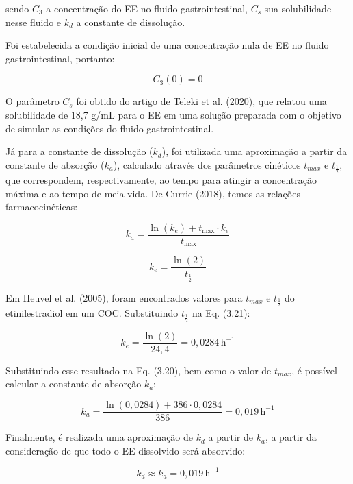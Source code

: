 \noindent sendo $C_3$ a concentração do EE no fluido gastrointestinal, $C_s$ sua solubilidade nesse fluido e $k_d$ a constante de dissolução.

Foi estabelecida a condição inicial de uma concentração nula de EE no fluido gastrointestinal, portanto:

\begin{equation}
    C_3(0) = 0
\end{equation}

O parâmetro $C_s$ foi obtido do artigo de Teleki et al. (2020), que relatou uma solubilidade de 18,7 \textmu g/mL para o EE em uma solução preparada com o objetivo de simular as condições do fluido gastrointestinal. 

Já para a constante de dissolução ($k_d$), foi utilizada uma aproximação a partir da constante de absorção ($k_a$), calculado através dos parâmetros cinéticos $t_{max}$ e $t_{\frac{1}{2}}$, que correspondem, respectivamente, ao tempo para atingir a concentração máxima e ao tempo de meia-vida. De Currie (2018), temos as relações farmacocinéticas:

\begin{equation}
    k_a = \frac{\ln(k_e) + t_{\text{max}} \cdot k_e}{t_{\text{max}}}
\end{equation}

\begin{equation}
    k_e = \frac{\ln(2)}{t_{\frac{1}{2}}}
\end{equation}

Em Heuvel et al. (2005), foram encontrados valores para $t_{max}$ e $t_{\frac{1}{2}}$ do etinilestradiol em um COC. Substituindo $t_{\frac{1}{2}}$ na Eq. (3.21):

\begin{equation}
    k_e = \frac{\ln(2)}{24,4} = 0,0284 \, \text{h}^{-1}
\end{equation}

Substituindo esse resultado na Eq. (3.20), bem como o valor de $t_{max}$, é possível calcular a constante de absorção $k_a$:

\begin{equation}
    k_a = \frac{\ln(0,0284) + 386 \cdot 0,0284}{386} = 0,019 \, \text{h}^{-1}
\end{equation}

Finalmente, é realizada uma aproximação de $k_d$ a partir de $k_a$, a partir da consideração de que todo o EE dissolvido será absorvido:

\begin{equation}
    k_d \approx k_a = 0,019 \, \text{h}^{-1}
\end{equation}


